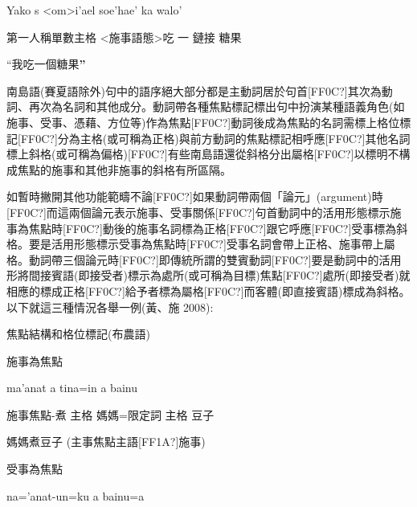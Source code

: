 \begin{listWWviiiNumviiileveli}
\item \begin{styleqwerty}\rmfamily
Yako  s <om>i’ael  soe’hae’  ka  walo’
\end{styleqwerty}
\end{listWWviiiNumviiileveli}
\rmfamily
  第一人稱單數主格  <施事語態>吃  一  鏈接  糖果

 \textrm{“我吃一個糖果}\textrm{\textbf{”}}

\textrm{南島語(賽夏語除外)句中的語序絕大部分都是主動詞居於句首[FF0C?]其次為動詞、再次為名詞和其他成分。動詞帶各種焦點標記標出句中扮演某種語義角色(如施事、受事、憑藉、方位等)作為焦點[FF0C?]動詞後成為焦點的名詞需標上格位標記[FF0C?]分為主格(或可稱為正格)與前方動詞的焦點標記相呼應[FF0C?]其他名詞標上斜格(或可稱為偏格)}[FF0C?]\textrm{有些南島語還從斜格分出屬格[FF0C?]以標明不構成焦點的施事和其他非施事的斜格有所區隔。}

\textrm{如暫時撇開其他功能範疇不論[FF0C?]如果動詞帶兩個「論元」(argument)時[FF0C?]而這兩個論元表示施事、受事關係[FF0C?]句首動詞中的活用形態標示施事為焦點時[FF0C?]動後的施事名詞標為正格[FF0C?]跟它呼應[FF0C?]受事標為斜格。要是活用形態標示受事為焦點時[FF0C?]受事名詞會帶上正格、施事帶上屬格。動詞帶三個論元時[FF0C?]即傳統所謂的雙賓動詞[FF0C?]要是動詞中的活用形將間接賓語(即接受者)標示為處所(或可稱為目標)焦點[FF0C?]處所(即接受者)就相應的標成正格[FF0C?]給予者標為屬格[FF0C?]而客體(即直接賓語)標成為斜格。以下就這三種情況各舉一例(黃、施 2008):}

\rmfamily
焦點結構和格位標記(布農語)

\rmfamily
施事為焦點

\begin{listWWviiiNumviiileveli}
\item \begin{styleqwerty}\rmfamily
ma’anat  a  tina=in  a  bainu
\end{styleqwerty}
\end{listWWviiiNumviiileveli}

 \textrm{施事焦點-煮  主格  媽媽=限定詞  主格  豆子}

 \textrm{媽媽煮豆子 (主事焦點主語[FF1A?]施事)}

\rmfamily
受事為焦點

\begin{listWWviiiNumviiileveli}
\item \begin{styleqwerty}\rmfamily
na=’anat-un=ku  a  bainu=a
\end{styleqwerty}
\end{listWWviiiNumviiileveli}

